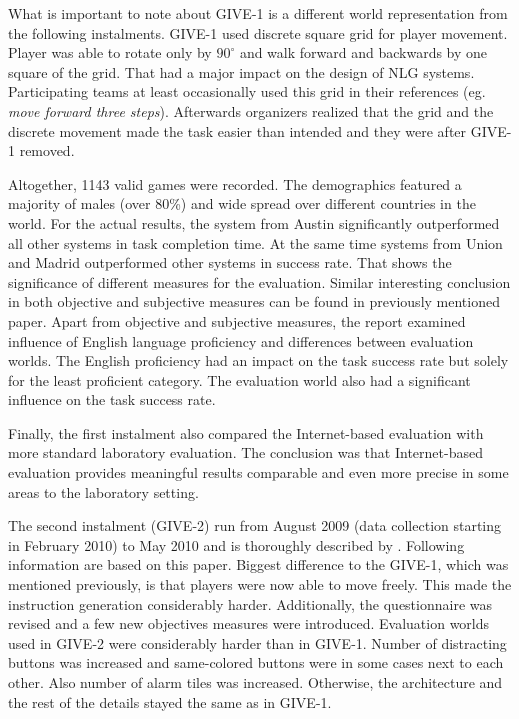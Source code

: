 What is important to note about GIVE-1 is a different world representation from the following instalments. GIVE-1 used discrete square grid for player movement. Player was able to rotate only by $90^{\circ}$ and walk forward and backwards by one square of the grid. That had a major impact on the design of NLG systems. Participating teams at least occasionally used this grid in their references (eg. \textit{move forward three steps}). Afterwards organizers realized that the grid and the discrete movement made the task easier than intended and they were after GIVE-1 removed.

Altogether, 1143 valid games were recorded. The demographics featured a majority of males (over 80\%) and wide spread over different countries in the world. For the actual results,  the system from Austin significantly outperformed all other systems in task completion time. At the same time systems from Union and Madrid outperformed other systems in success rate. That shows the significance of different measures for the evaluation. Similar interesting conclusion in both objective and subjective measures can be found in previously mentioned paper. Apart from objective and subjective measures, the report examined influence of English language proficiency and differences between evaluation worlds. The English proficiency had an impact on the task success rate but solely for the least proficient category. The evaluation world also had a significant influence on the task success rate.

Finally, the first instalment also compared the Internet-based evaluation with more standard laboratory evaluation. The conclusion was that Internet-based evaluation provides meaningful results comparable and even more precise in some areas to the laboratory setting.

The second instalment (GIVE-2) run from August 2009 (data collection starting in February 2010) to May 2010 and is thoroughly described by \citet{koller2010report}. Following information are based on this paper. Biggest difference to the GIVE-1, which was mentioned previously, is that players were now able to move freely. This made the instruction generation considerably harder. Additionally, the questionnaire was revised and a few new objectives measures were introduced. Evaluation worlds used in GIVE-2 were considerably harder than in GIVE-1. Number of distracting buttons was increased and same-colored buttons were in some cases next to each other. Also number of alarm tiles was increased. Otherwise, the architecture and the rest of the details stayed the same as in GIVE-1.

